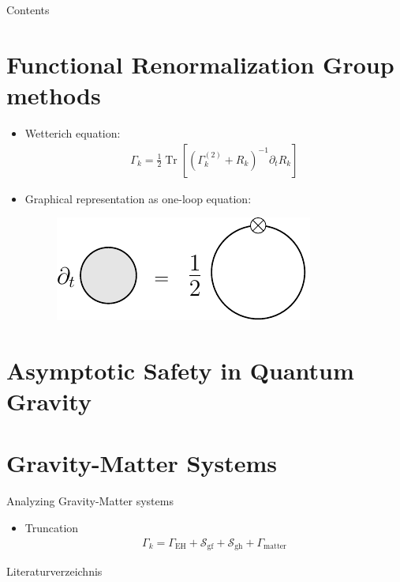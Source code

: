 \documentclass{beamer}
\begin{document}
\maketitle

\begin{frame}{Contents}
\tableofcontents
\end{frame}
\section{Functional Renormalization Group methods}
\begin{frame}
\begin{itemize}
	\item Wetterich equation:
	\begin{align}
		\Gamma_k = \frac{1}{2}\operatorname{Tr}\left[\left(\Gamma^{(2)}_k + R_k\right)^{-1}\partial_tR_k \right]
	\end{align}
	\item Graphical representation as one-loop equation:
	\begin{figure}
		\centering
		\includegraphics{figures/wetterich_equation}
	\end{figure}
\end{itemize}
\end{frame}


\section{Asymptotic Safety in Quantum Gravity}

\section{Gravity-Matter Systems}
\begin{frame}{Analyzing Gravity-Matter systems}
\begin{itemize}
	\item Truncation \cite{DonaEichhornPercacci2013}
	\begin{align}
		\Gamma_k = \Gamma_{\text{EH}} + \mathcal{S}_{\text{gf}} + \mathcal{S}_{\text{gh}} + \Gamma_{\text{matter}}
	\end{align}
\end{itemize}
\end{frame}
\begin{frame}[shrink=20]{Literaturverzeichnis}

\printbibliography
\cite{*} %
\end{frame}
\end{document}
